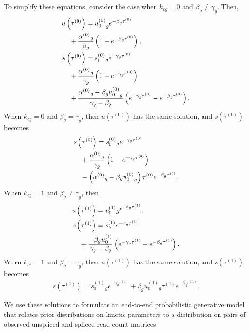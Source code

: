 \documentclass[
  sn-mathphys-num,
  lineno,
  twocolumn]{sn-jnl}
\begin{document}
To simplify these equations, consider the case when \(k_{cg} = 0\) and
\(\beta_g \neq \gamma_g\). Then, \begin{align}
u\left(\tau^{(0)}\right) &= {u_0^{(0)}}_g e^{-\beta_g \tau^{(0)}} \nonumber \\
  & \hskip -24pt + \frac{{\alpha^{(0)}}_g}{\beta_g}\left(1-e^{-\beta_g \tau^{(0)}}\right), 
  \label{eq-sol-usimp} \\
s\left(\tau^{(0)}\right) &= s_0^{(0)}{ }_g e^{-\gamma_g \tau^{(0)}} \nonumber \\
  & \hskip -24pt +\frac{{\alpha^{(0)}}_g}{\gamma_g}\left(1-e^{-\gamma_g \tau^{(0)}}\right) 
  \nonumber\\
  & \hskip -24pt +\frac{{\alpha^{(0)}}_g-\beta_g {u_0^{(0)}}_g}{\gamma_g-\beta_g}
  \left(e^{-\gamma_g \tau^{(0)}}-e^{-\beta_g \tau^{(0)}}\right). \label{eq-sol-ssimp}
\end{align} When \(k_{cg} = 0\) and \(\beta_g = \gamma_g\), then
\(u\left(\tau^{(0)}\right)\) has the same solution, and
\(s\left(\tau^{(0)}\right)\) becomes \begin{align}
s\left(\tau^{(0)}\right) &= s_0^{(0)}{ }_g e^{-\gamma_g \tau^{(0)}} \nonumber \\
  & \hskip -24pt +\frac{{\alpha^{(0)}}_g}{\gamma_g}
    \left(1-e^{-\gamma_g \tau^{(0)}}\right) \nonumber\\
  & \hskip -24pt - \left( {\alpha^{(0)}}_g-\beta_g {u_0^{(0)}}_g \right) 
    \tau^{(0)} e^{-\beta_g \tau^{(0)}}. \label{eq-sol-ssimp2}
\end{align} When \(k_{cg} = 1\) and \(\beta_g \neq \gamma_g\), then
\begin{align}
u\left(\tau^{(1)}\right) &=u_0^{(1)} g^{e^{-\beta_g \tau^{(1)}}}, \\
s\left(\tau^{(1)}\right) &=s_0^{(1)} e^{-\gamma_g \tau^{(1)}} \nonumber \\
  & \hskip -24pt +\frac{-\beta_g u_0^{(1)}}{\gamma_g-\beta_g}
  \left(e^{-\gamma_g \tau^{(1)}}-e^{-\beta_g \tau^{(1)}}\right).
\end{align} When \(k_{cg} = 1\) and \(\beta_g = \gamma_g\), then
\(u\left(\tau^{(1)}\right)\) has the same solution, and
\(s\left(\tau^{(1)}\right)\) becomes \begin{align}
s\left(\tau^{(1)}\right)=s_0^{(1)}{ }_g e^{-\gamma_g \tau^{(1)}}
  +\beta_g u_0^{(1)}{ }_g \tau^{(1)} e^{-\beta_g \tau^{(1)}}.
\end{align}

We use these solutions to formulate an end-to-end probabilistic
generative model that relates prior distributions on kinetic parameters
to a distribution on pairs of observed unspliced and spliced read count
matrices
\end{document}
